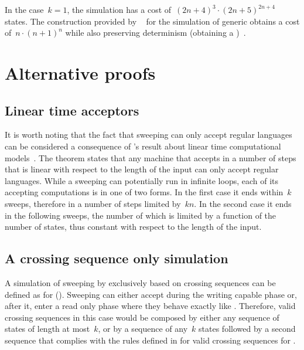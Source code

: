 In the case~$k=1$, the simulation has a cost of~$(2n+4)^3\cdot(2n+5)^{2n+4}$ states.
The construction provided by \citeauthor{PigPis14}~\cite{PigPis14} for the simulation of generic \ODLAs obtains a cost of~$n\cdot (n+1)^n$ while also preserving determinism (\ie obtaining a \ODFA)~\cite{PigPis14}.



\section{Alternative proofs}\label{sec:alt-proofs}


\subsection{Linear time acceptors}
It is worth noting that the fact that sweeping \kDLAs can only accept regular languages can be considered a consequence of \citeauthor{Hen65}'s result about linear time computational models~\cite{Hen65}.
The theorem states that any machine that accepts in a number of steps that is linear with respect to the length of the input can only accept regular languages.
While a sweeping \kLA can potentially run in infinite loops, each of its accepting computations is in one of two forms.
In the first case it ends within~$k$ sweeps, therefore in a number of steps limited by~$kn$.
In the second case it ends in the following sweeps, the number of which is limited by a function of the number of states, thus constant with respect to the length of the input.


\subsection{A crossing sequence only simulation}
A simulation of sweeping \kDLAs by \ONFAs exclusively based on crossing sequences can be defined as for \TDFAs ().
Sweeping \kDLAs can either accept during the writing capable phase or, after it, enter a read only phase where they behave exactly like \TDFAs.
Therefore, valid crossing sequences in this case would be composed by either any sequence of states of length at most~$k$, or by a sequence of any~$k$ states followed by a second sequence that complies with the rules defined in  for valid crossing sequences for \TDFAs.

